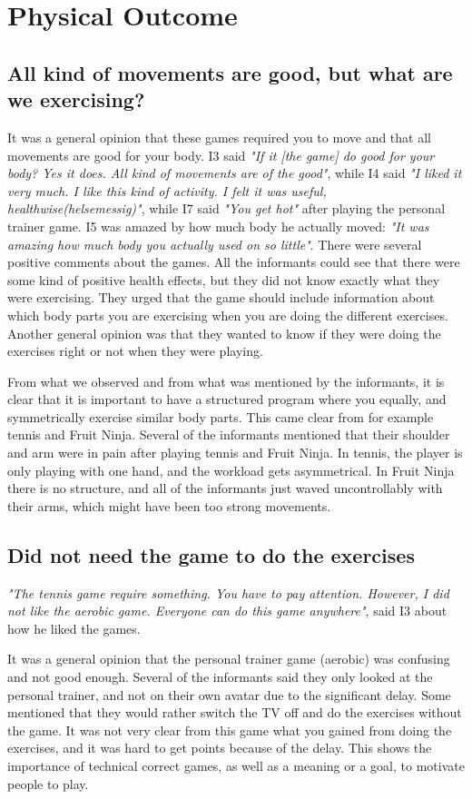 \section{Physical Outcome}

\subsection{All kind of movements are good, but what are we exercising?}
It was a general opinion that these games required you to move and that all movements are good for your body. I3 said \emph{"If it [the game] do good for your body? Yes it does. All kind of movements are of the good"}, while I4 said  \emph{"I liked it very much. I like this kind of activity. I felt it was useful, healthwise(helsemessig)"}, while I7 said \emph{"You get hot"} after playing the personal trainer game. I5 was amazed by how much body he actually moved: \emph{"It was amazing how much body you actually used on so little"}. There were several positive comments about the games. All the informants could see that there were some kind of positive health effects, but they did not know exactly what they were exercising. They urged that the game should include information about which body parts you are exercising when you are doing the different exercises. Another general opinion was that they wanted to know if they were doing the exercises right or not when they were playing. 

From what we observed and from what was mentioned by the informants, it is clear that it is important to have a structured program where you equally, and symmetrically exercise similar body parts. This came clear from for example tennis and Fruit Ninja. Several of the informants mentioned that their shoulder and arm were in pain after playing tennis and Fruit Ninja. In tennis, the player is only playing with one hand, and the workload gets asymmetrical. In Fruit Ninja there is no structure, and all of the informants just waved uncontrollably with their arms, which might have been too strong movements.

\subsection{Did not need the game to do the exercises}
\emph{"The tennis game require something. You have to pay attention. However, I did not like the aerobic game. Everyone can do this game anywhere"}, said I3 about how he liked the games. 

It was a general opinion that the personal trainer game (aerobic) was confusing and not good enough. Several of the informants said they only looked at the personal trainer, and not on their own avatar due to the significant delay. Some mentioned that they would rather switch the TV off and do the exercises without the game. It was not very clear from this game what you gained from doing the exercises, and it was hard to get points because of the delay. This shows the importance of technical correct games, as well as a meaning or a goal, to motivate people to play. 

